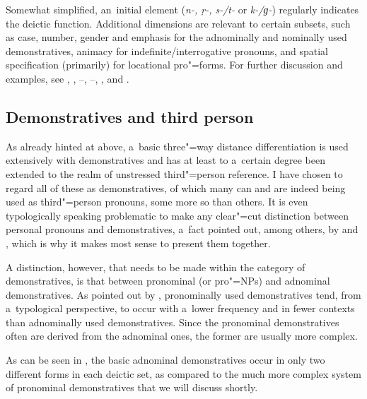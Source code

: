 Somewhat simplified, an~initial element (\textit{n-, ṛ-, s-/t-} or \textit{k-/ɡ-}) regularly indicates the deictic function. Additional dimensions are relevant to certain subsets, such as case, number, gender and emphasis for the adnominally and nominally used demonstratives, animacy for indefinite/interrogative pronouns, and spatial specification (primarily) for locational pro"=forms. For further discussion and examples, see , , --, --, ,  and .

\subsection{Demonstratives and third person}
\label{subsec:5-2-2}


As already hinted at above, a~basic three"=way distance differentiation is used extensively with demonstratives and has at least to a~certain degree been extended to the realm of unstressed third"=person reference. I have chosen to regard all of these as demonstratives, of which many can and are indeed being used as third"=person pronouns, some more so than others. It is even typologically speaking problematic to make any clear"=cut distinction between personal pronouns and demonstratives, a~fact pointed out, among others, by \citet[206]{himmelmann1996} and \citet[123--124]{kibrik2011}, which is why it makes most sense to present them together.



A distinction, however, that needs to be made within the category of demonstratives, is that between pronominal (or pro"=NPs) and adnominal demonstratives. As pointed out by \citet[206]{himmelmann1996}, pronominally used demonstratives tend, from a~typological perspective, to occur with a~lower frequency and in fewer contexts than adnominally used demonstratives. Since the pronominal demonstratives often are derived from the adnominal ones, the former are usually more complex. 



As can be seen in , the basic adnominal demonstratives occur in only two different forms in each deictic set, as compared to the much more complex system of pronominal demonstratives that we will discuss shortly. 



